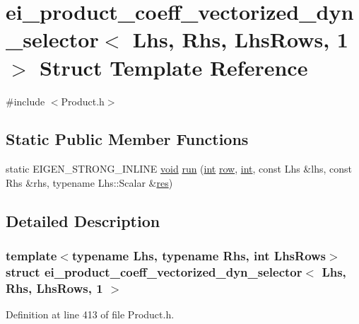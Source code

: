 \hypertarget{structei__product__coeff__vectorized__dyn__selector_3_01_lhs_00_01_rhs_00_01_lhs_rows_00_011_01_4}{\section{ei\-\_\-product\-\_\-coeff\-\_\-vectorized\-\_\-dyn\-\_\-selector$<$ Lhs, Rhs, Lhs\-Rows, 1 $>$ Struct Template Reference}
\label{structei__product__coeff__vectorized__dyn__selector_3_01_lhs_00_01_rhs_00_01_lhs_rows_00_011_01_4}
}


{\ttfamily \#include $<$Product.\-h$>$}

\subsection*{Static Public Member Functions}
\begin{DoxyCompactItemize}
\item 
static E\-I\-G\-E\-N\-\_\-\-S\-T\-R\-O\-N\-G\-\_\-\-I\-N\-L\-I\-N\-E \hyperlink{group___u_a_v_objects_plugin_ga444cf2ff3f0ecbe028adce838d373f5c}{void} \hyperlink{structei__product__coeff__vectorized__dyn__selector_3_01_lhs_00_01_rhs_00_01_lhs_rows_00_011_01_4_adbba4b49c3c9571a44ddc2305493117a}{run} (\hyperlink{ioapi_8h_a787fa3cf048117ba7123753c1e74fcd6}{int} \hyperlink{glext_8h_a11b277b422822f784ee248b43eee3e1e}{row}, \hyperlink{ioapi_8h_a787fa3cf048117ba7123753c1e74fcd6}{int}, const Lhs \&lhs, const Rhs \&rhs, typename Lhs\-::\-Scalar \&\hyperlink{glext_8h_a1dbb21208b9047cc8031ca9c840d3c2f}{res})
\end{DoxyCompactItemize}


\subsection{Detailed Description}
\subsubsection*{template$<$typename Lhs, typename Rhs, int Lhs\-Rows$>$struct ei\-\_\-product\-\_\-coeff\-\_\-vectorized\-\_\-dyn\-\_\-selector$<$ Lhs, Rhs, Lhs\-Rows, 1 $>$}



Definition at line 413 of file Product.\-h.



